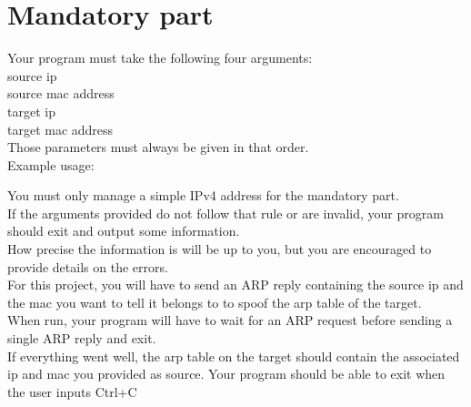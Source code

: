 \documentclass{42-en}
\begin{document}
\chapter{Mandatory part}

    Your program must take the following four arguments:\\
    source ip\\
    source mac address\\
    target ip\\
    target mac address\\
    Those parameters must always be given in that order.\\

        Example usage:

    You must only manage a simple IPv4 address for the mandatory part.\\
    If the arguments provided do not follow that rule or are invalid, your program should exit and output some information.\\
    How precise the information is will be up to you, but you are encouraged to provide details on the errors.\\

    For this project, you will have to send an ARP reply containing the source ip and the mac you want to tell it belongs to
    to spoof the arp table of the target.\\
    When run, your program will have to wait for an ARP request before sending a single ARP reply and exit.\\
    If everything went well, the arp table on the target should contain the associated ip and mac you provided as source.
    Your program should be able to exit when the user inputs Ctrl+C


\end{document}
